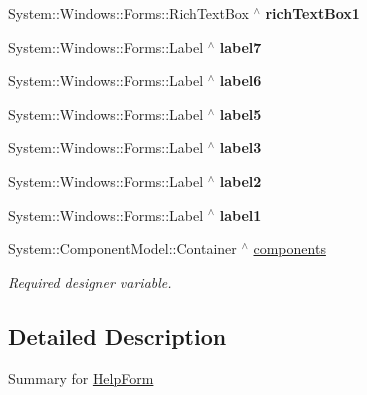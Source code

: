 \begin{DoxyCompactItemize}
System\+::\+Windows\+::\+Forms\+::\+Rich\+Text\+Box $^\wedge$ {\bfseries rich\+Text\+Box1}
\item 
\mbox{\label{class_gaze_track_g_u_i_1_1_help_form_a22a3895c5164f46abe3e27ebdaab18f0}} 
System\+::\+Windows\+::\+Forms\+::\+Label $^\wedge$ {\bfseries label7}
\item 
\mbox{\label{class_gaze_track_g_u_i_1_1_help_form_a8f6eca8124302d3fc6548eb83e2423c4}} 
System\+::\+Windows\+::\+Forms\+::\+Label $^\wedge$ {\bfseries label6}
\item 
\mbox{\label{class_gaze_track_g_u_i_1_1_help_form_aa7cec3b7df9cfa3407ea6dded8d2453d}} 
System\+::\+Windows\+::\+Forms\+::\+Label $^\wedge$ {\bfseries label5}
\item 
\mbox{\label{class_gaze_track_g_u_i_1_1_help_form_ab766ec0d0531433aab577a5eaa021931}} 
System\+::\+Windows\+::\+Forms\+::\+Label $^\wedge$ {\bfseries label3}
\item 
\mbox{\label{class_gaze_track_g_u_i_1_1_help_form_a210ac48f61d805a74914a7a48d70556f}} 
System\+::\+Windows\+::\+Forms\+::\+Label $^\wedge$ {\bfseries label2}
\item 
\mbox{\label{class_gaze_track_g_u_i_1_1_help_form_a1916003b27ed300ab4d7a605aa591a61}} 
System\+::\+Windows\+::\+Forms\+::\+Label $^\wedge$ {\bfseries label1}
\item 
System\+::\+Component\+Model\+::\+Container $^\wedge$ \mbox{\hyperlink{class_gaze_track_g_u_i_1_1_help_form_a562fda94d052719c80f2292dfd896f14}{components}}
\begin{DoxyCompactList}\small\item\em Required designer variable. \end{DoxyCompactList}\end{DoxyCompactItemize}


\subsection{Detailed Description}
Summary for \mbox{\hyperlink{class_gaze_track_g_u_i_1_1_help_form}{Help\+Form}} 



